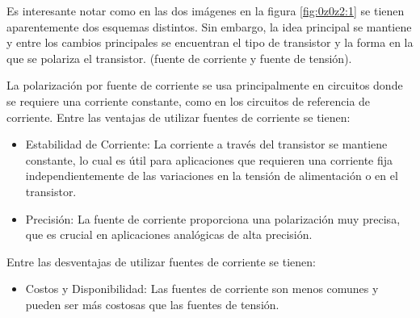 Es interesante notar como en las dos imágenes en la figura \ref{fig:0z0z2:1} se tienen aparentemente dos esquemas distintos. Sin embargo, la idea principal se mantiene y entre los cambios principales se encuentran el tipo de transistor y la forma en la que se polariza el transistor. (fuente de corriente y fuente de tensión).

La polarización por fuente de corriente se usa principalmente en circuitos donde se requiere una corriente constante, como en los circuitos de referencia de corriente. Entre las ventajas de utilizar fuentes de corriente se tienen:
\begin{itemize}
    \item Estabilidad de Corriente: La corriente a través del transistor se mantiene constante, lo cual es útil para aplicaciones que requieren una corriente fija independientemente de las variaciones en la tensión de alimentación o en el transistor.
    \item Precisión: La fuente de corriente proporciona una polarización muy precisa, que es crucial en aplicaciones analógicas de alta precisión.
\end{itemize}

Entre las desventajas de utilizar fuentes de corriente se tienen:

\begin{itemize}
    \item Costos y Disponibilidad: Las fuentes de corriente son menos comunes y pueden ser más costosas que las fuentes de tensión.
\end{itemize}


